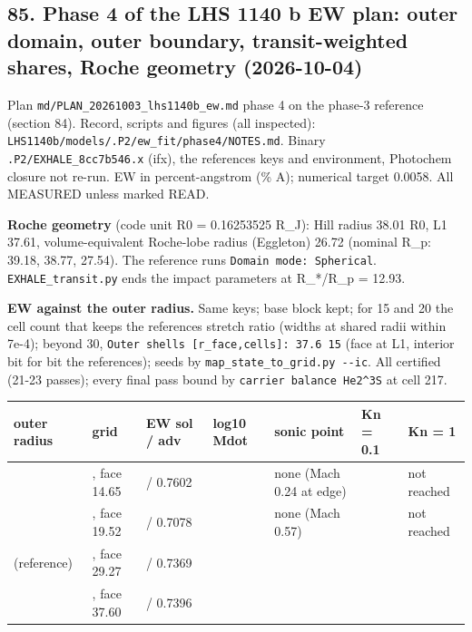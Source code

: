 \documentclass[english,a4paper]{my_memo}
\begin{document}
\subsection{85. Phase 4 of the LHS 1140 b EW plan: outer domain, outer boundary, transit-weighted shares, Roche geometry (2026-10-04)}\label{85-phase-4-of-the-lhs-1140-b-ew-plan-outer-domain-outer-boundary-transit-weighted-shares-roche-geometry-2026-10-04}

Plan \texttt{md/PLAN\_20261003\_lhs1140b\_ew.md} phase 4 on the phase-3 reference
(section 84). Record, scripts and figures (all inspected):
\texttt{LHS1140b/models/.P2/ew\_fit/phase4/NOTES.md}. Binary \texttt{.P2/EXHALE\_8cc7b546.x}
(ifx), the reference\textquotesingle s keys and environment, Photochem closure not re-run.
EW in percent-angstrom (\% A); numerical target 0.0058. All MEASURED unless
marked READ.

\textbf{Roche geometry} (code unit R0 = 0.16253525 R\_J): Hill radius 38.01 R0,
L1 37.61, volume-equivalent Roche-lobe radius (Eggleton) 26.72 (nominal
R\_p: 39.18, 38.77, 27.54). The reference runs \texttt{Domain\ mode:\ Spherical}.
\texttt{EXHALE\_transit.py} ends the impact parameters at R\_*/R\_p = 12.93.

\textbf{EW against the outer radius.} Same keys; base block kept; for 15 and 20
the cell count that keeps the reference\textquotesingle s stretch ratio (widths at shared
radii within 7e-4); beyond 30, \texttt{Outer\ shells\ {[}r\_face,cells{]}:\ 37.6\ 15} (face
at L1, interior bit for bit the reference\textquotesingle s); seeds by
\texttt{map\_state\_to\_grid.py\ -\/-ic}. All certified (21-23 passes); every final pass
bound by \texttt{carrier\ balance\ He2\^{}3S} at cell 217.

{\def\LTcaptype{none} %
{\small
\begin{longtable}[]{@{}>{\raggedright\arraybackslash}p{\dimexpr(\linewidth-14\tabcolsep)/7\relax}>{\raggedright\arraybackslash}p{\dimexpr(\linewidth-14\tabcolsep)/7\relax}>{\raggedright\arraybackslash}p{\dimexpr(\linewidth-14\tabcolsep)/7\relax}>{\raggedright\arraybackslash}p{\dimexpr(\linewidth-14\tabcolsep)/7\relax}>{\raggedright\arraybackslash}p{\dimexpr(\linewidth-14\tabcolsep)/7\relax}>{\raggedright\arraybackslash}p{\dimexpr(\linewidth-14\tabcolsep)/7\relax}>{\raggedright\arraybackslash}p{\dimexpr(\linewidth-14\tabcolsep)/7\relax}@{}}
\toprule\noalign{}
outer radius & grid & EW sol / adv & log10 Mdot & sonic point & Kn = 0.1 & Kn = 1 \\
\midrule\noalign{}
\endhead
\bottomrule\noalign{}
\endlastfoot
15 & 458, face 14.65 & 0.7565 / 0.7602 & 7.885528 & none (Mach 0.24 at edge) & 5.97 & not reached \\
20 & 476, face 19.52 & 0.7044 / 0.7078 & 7.885798 & none (Mach 0.57) & 5.62 & not reached \\
30 (reference) & 500, face 29.27 & 0.7334 / 0.7369 & 7.885456 & 25.69 & 5.69 & 17.21 \\
37.6 & 515, face 37.60 & 0.7360 / 0.7396 & 7.885425 & 25.73 & 5.70 & 17.29 \\
\end{longtable}
}
}
\end{document}
